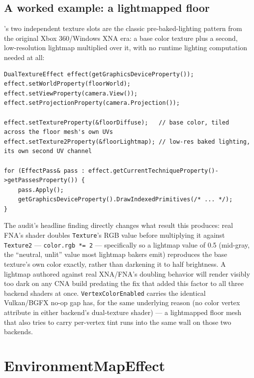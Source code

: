 \subsection{A worked example: a lightmapped floor}

's two independent texture slots are the classic pre-baked-lighting
pattern from the original Xbox 360/Windows XNA era: a base color texture plus a second,
low-resolution lightmap multiplied over it, with no runtime lighting computation needed at all:

\begin{lstlisting}
DualTextureEffect effect(getGraphicsDeviceProperty());
effect.setWorldProperty(floorWorld);
effect.setViewProperty(camera.View());
effect.setProjectionProperty(camera.Projection());

effect.setTextureProperty(&floorDiffuse);   // base color, tiled across the floor mesh's own UVs
effect.setTexture2Property(&floorLightmap); // low-res baked lighting, its own second UV channel

for (EffectPass& pass : effect.getCurrentTechniqueProperty()->getPassesProperty()) {
    pass.Apply();
    getGraphicsDeviceProperty().DrawIndexedPrimitives(/* ... */);
}
\end{lstlisting}

The audit's headline finding directly changes what result this produces: real FNA's shader
doubles \texttt{Texture}'s RGB value before multiplying it against \texttt{Texture2} ---
\texttt{color.rgb *= 2} --- specifically so a lightmap value of 0.5 (mid-gray, the ``neutral,
unlit'' value most lightmap bakers emit) reproduces the base texture's own color exactly, rather
than darkening it to half brightness. A lightmap authored against real XNA/FNA's doubling
behavior will render visibly too dark on any CNA build predating the fix that added this factor
to all three backend shaders at once. \texttt{VertexColorEnabled} carries the identical
Vulkan/BGFX no-op gap  has, for the same underlying reason (no color
vertex attribute in either backend's dual-texture shader) --- a lightmapped floor mesh that also
tries to carry per-vertex tint runs into the same wall on those two backends.

\section{EnvironmentMapEffect}

